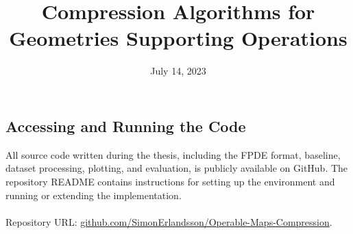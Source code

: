 \documentclass[nofilelist]{cslthse-msc}
\title{Compression Algorithms for Geometries Supporting Operations}
\date{July 14, 2023}
\begin{document}
\renewcommand{\bibname}{References}

    \makefrontmatter









{}

\begin{appendices}
\chapter{Accessing and Running the Code}
All source code written during the thesis, including the FPDE format, baseline, dataset processing, plotting, and evaluation, is publicly available on GitHub. The repository README contains instructions for setting up the environment and running or extending the implementation.
\\\\
Repository URL: \href{https://github.com/SimonErlandsson/Operable-Maps-Compression}{github.com/SimonErlandsson/Operable-Maps-Compression}.




\printfilelist

\checkoddpage
\ifoddpage
\else
   \newpage
   \thispagestyle{empty}
   \mbox{ }
\fi

\end{appendices}
\end{document}
